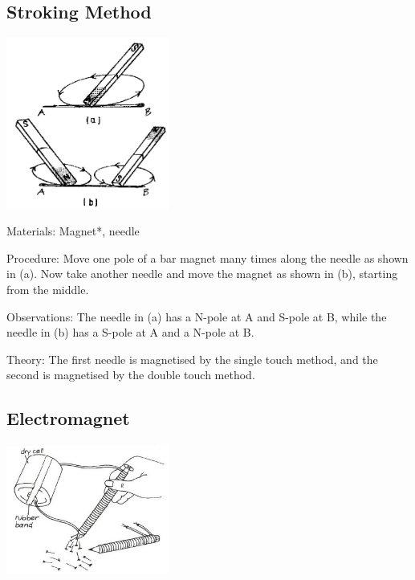 \begin{multicols}{2}
\subsection{Stroking Method}

\begin{center}
\includegraphics[width=0.4\textwidth]{./img/source/mag-stroke.png}
\end{center}

\begin{description*}
\item[Materials:]{Magnet*, needle}
\item[Procedure:]{Move one pole of a bar magnet many times along the needle as shown in (a). Now take another needle and move the magnet as shown in (b), starting from the middle.}
\item[Observations:]{The needle in (a) has a N-pole at A and S-pole at B, while the needle in (b) has a S-pole at A and a N-pole at B.}
\item[Theory:]{The first needle is magnetised by the single touch method, and the second is magnetised by the double touch method.}
\end{description*}

\subsection{Electromagnet}

\begin{center}
\includegraphics[width=0.4\textwidth]{./img/vso/electromagnet.png}
\end{center}


\end{multicols}
